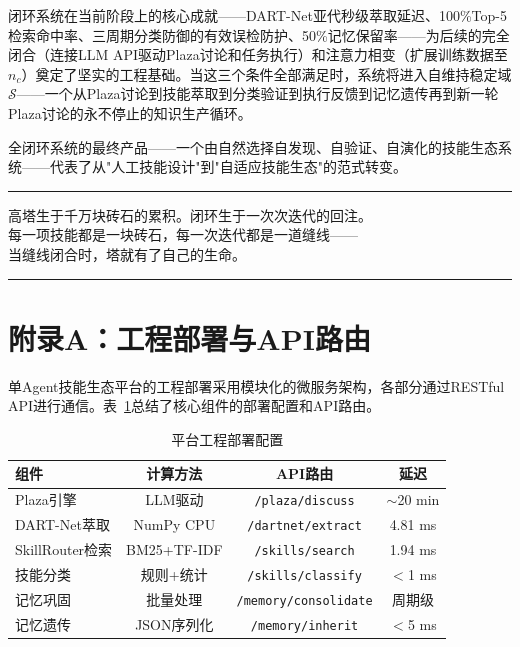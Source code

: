 \documentclass[12pt,a4paper]{ctexart}
\begin{document}
闭环系统在当前阶段上的核心成就——DART-Net亚代秒级萃取延迟、100\%Top-5检索命中率、三周期分类防御的有效误检防护、50\%记忆保留率——为后续的完全闭合（连接LLM API驱动Plaza讨论和任务执行）和注意力相变（扩展训练数据至$n_c$）奠定了坚实的工程基础。当这三个条件全部满足时，系统将进入自维持稳定域$\mathcal{S}$——一个从Plaza讨论到技能萃取到分类验证到执行反馈到记忆遗传再到新一轮Plaza讨论的永不停止的知识生产循环。

全闭环系统的最终产品——一个由自然选择自发现、自验证、自演化的技能生态系统——代表了从"人工技能设计"到"自适应技能生态"的范式转变。

\vspace{12pt}
\hrule
\vspace{8pt}

\begin{center}
{\kaishu 高塔生于千万块砖石的累积。闭环生于一次次迭代的回注。\\
每一项技能都是一块砖石，每一次迭代都是一道缝线——\\
当缝线闭合时，塔就有了自己的生命。}
\end{center}

\vspace{8pt}
\hrule
\vspace{12pt}

\section*{附录A：工程部署与API路由}

单Agent技能生态平台的工程部署采用模块化的微服务架构，各部分通过RESTful API进行通信。表~\ref{tab:deployment}总结了核心组件的部署配置和API路由。

\begin{table}[H]
\centering
\caption{平台工程部署配置}
\label{tab:deployment}
\renewcommand{\arraystretch}{1.2}
\begin{tabular}{lccc}
\toprule
组件 & 计算方法 & API路由 & 延迟 \\
\midrule
Plaza引擎 & LLM驱动 & \texttt{/plaza/discuss} & $\sim$20 min \\
DART-Net萃取 & NumPy CPU & \texttt{/dartnet/extract} & 4.81 ms \\
SkillRouter检索 & BM25+TF-IDF & \texttt{/skills/search} & 1.94 ms \\
技能分类 & 规则+统计 & \texttt{/skills/classify} & $<$1 ms \\
记忆巩固 & 批量处理 & \texttt{/memory/consolidate} & 周期级 \\
记忆遗传 & JSON序列化 & \texttt{/memory/inherit} & $<$5 ms \\
\bottomrule
\end{tabular}
\end{table}
\end{document}
